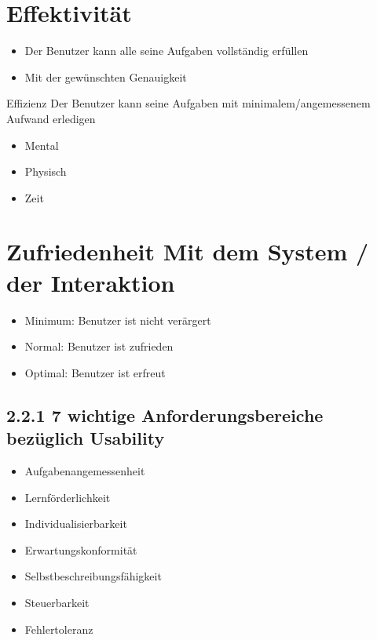 \section*{Effektivität}
\begin{itemize}
  \item Der Benutzer kann alle seine Aufgaben vollständig erfüllen
  \item Mit der gewünschten Genauigkeit
\end{itemize}

Effizienz Der Benutzer kann seine Aufgaben mit minimalem/angemessenem Aufwand erledigen

\begin{itemize}
  \item Mental
  \item Physisch
  \item Zeit
\end{itemize}

\section*{Zufriedenheit Mit dem System / der Interaktion}
\begin{itemize}
  \item Minimum: Benutzer ist nicht verärgert
  \item Normal: Benutzer ist zufrieden
  \item Optimal: Benutzer ist erfreut
\end{itemize}

\subsection*{2.2.1 7 wichtige Anforderungsbereiche bezüglich Usability}
\begin{itemize}
  \item Aufgabenangemessenheit
  \item Lernförderlichkeit
  \item Individualisierbarkeit
  \item Erwartungskonformität
  \item Selbstbeschreibungsfähigkeit
  \item Steuerbarkeit
  \item Fehlertoleranz
\end{itemize}

